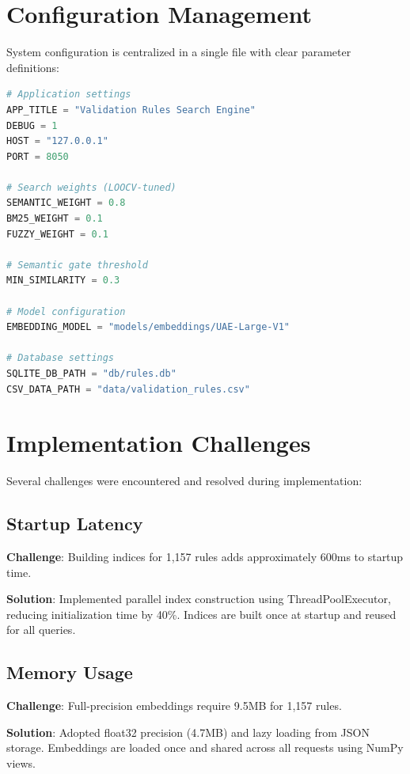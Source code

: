\section{Configuration Management}

System configuration is centralized in a single file with clear parameter definitions:

\begin{lstlisting}[language=Python, caption={Configuration settings (config.py)}, label={lst:config}]
# Application settings
APP_TITLE = "Validation Rules Search Engine"
DEBUG = 1
HOST = "127.0.0.1"
PORT = 8050

# Search weights (LOOCV-tuned)
SEMANTIC_WEIGHT = 0.8
BM25_WEIGHT = 0.1
FUZZY_WEIGHT = 0.1

# Semantic gate threshold
MIN_SIMILARITY = 0.3

# Model configuration
EMBEDDING_MODEL = "models/embeddings/UAE-Large-V1"

# Database settings
SQLITE_DB_PATH = "db/rules.db"
CSV_DATA_PATH = "data/validation_rules.csv"
\end{lstlisting}

\section{Implementation Challenges}

Several challenges were encountered and resolved during implementation:

\subsection{Startup Latency}

\textbf{Challenge}: Building indices for 1,157 rules adds approximately 600ms to startup time.

\textbf{Solution}: Implemented parallel index construction using ThreadPoolExecutor, reducing initialization time by 40\%. Indices are built once at startup and reused for all queries.

\subsection{Memory Usage}

\textbf{Challenge}: Full-precision embeddings require 9.5MB for 1,157 rules.

\textbf{Solution}: Adopted float32 precision (4.7MB) and lazy loading from JSON storage. Embeddings are loaded once and shared across all requests using NumPy views.

